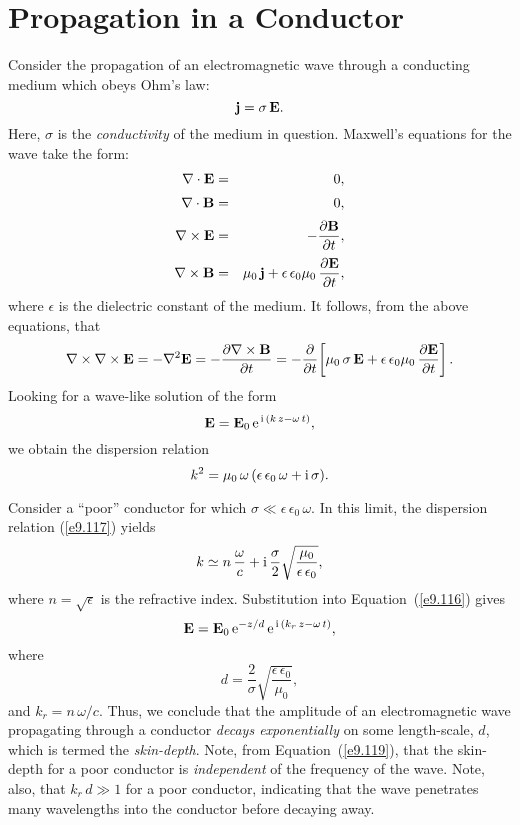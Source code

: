 \section{Propagation in a Conductor}\label{s9.9}
Consider the propagation of an electromagnetic wave through a conducting
medium which obeys Ohm's law:
\begin{equation}
{\bf j} = \sigma\,{\bf E}.
\end{equation}
Here, $\sigma$ is the {\em conductivity} of the medium in question. 
Maxwell's equations for the wave take the form:
\begin{eqnarray}
\nabla\cdot{\bf E} &=& 0,\\[0.5ex]
\nabla\cdot{\bf B} &=& 0,\\[0.5ex]
\nabla\times{\bf E} &=& - \frac{\partial {\bf B}}{\partial t},\\[0.5ex]
\nabla\times{\bf B} &=&\mu_0\,{\bf j} + \epsilon\,\epsilon_0\mu_0\,\frac{\partial {\bf E}}{\partial t},
\end{eqnarray}
where $\epsilon$ is the dielectric constant of the medium.
It follows, from the above equations, that
\begin{equation}
\nabla\times\nabla\times{\bf E} = -\nabla^2{\bf E} = -\frac{\partial
\nabla\times{\bf B}}{\partial t} =-\frac{\partial}{\partial t}\!\left[
\mu_0\,\sigma\,{\bf E} + \epsilon\,\epsilon_0\mu_0\,\frac{\partial {\bf E}}{\partial t}\right].
\end{equation}
Looking for a wave-like solution of the form
\begin{equation}\label{e9.116}
{\bf E} = {\bf E}_0\,{\rm e}^{\,{\rm i}\,(k\,z-\omega\,t)},
\end{equation}
we obtain the dispersion relation
\begin{equation}\label{e9.117}
k^2 = \mu_0\,\omega\,(\epsilon\,\epsilon_0\,\omega + {\rm i}\,\sigma).
\end{equation}

Consider a ``poor'' conductor for which $\sigma\ll \epsilon\,\epsilon_0\,\omega$. In this limit, the dispersion relation 
(\ref{e9.117}) yields
\begin{equation}
k\simeq n\,\frac{\omega}{c} + {\rm i}\,\frac{\sigma}{2}\sqrt{\frac{\mu_0}
{\epsilon\,\epsilon_0}},
\end{equation}
where $n=\sqrt{\epsilon}$ is the refractive index.
Substitution into Equation~(\ref{e9.116}) gives
\begin{equation}\label{e9.118}
{\bf E} = {\bf E}_0\,{\rm e}^{-z/d}\,{\rm e}^{\,{\rm i}\,(k_r\,z-\omega\,t)},
\end{equation}
where
\begin{equation}\label{e9.119}
d = \frac{2}{\sigma}\sqrt{\frac{\epsilon\,\epsilon_0}{\mu_0}},
\end{equation}
and $k_r = n\,\omega/c$. Thus, we conclude that the amplitude
of an electromagnetic wave propagating through a conductor
{\em decays exponentially} on some length-scale, $d$, which
is termed the {\em skin-depth}.  Note, from Equation~(\ref{e9.119}),
that the skin-depth for a poor conductor is {\em independent} of the frequency
of the wave. Note, also, that $k_r\,d\gg 1$ for a poor conductor,
indicating that the wave penetrates many wavelengths into the
conductor before decaying away. 

